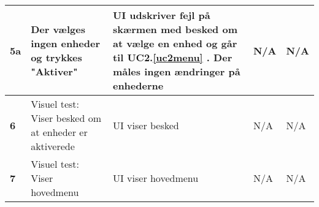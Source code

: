 \begin{center}
\begin{longtable}{|p{}|p{}|p{}|p{}|p{}|}
\textbf{5a}			&Der vælges ingen enheder og trykkes "Aktiver"				
					&UI udskriver fejl på skærmen med besked om at vælge en enhed og går til UC2.\ref{uc2menu}	. 
					 Der måles ingen ændringer på enhederne
					&N/A 
					&N/A \\\hline
		
\textbf{6}			&Visuel test: Viser besked om at enheder er aktiverede
					&UI viser besked
					&N/A
					&N/A \\\hline
					
\textbf{7}			&Visuel test: Viser hovedmenu
					&UI viser hovedmenu
					&N/A
					&N/A \\\hline

															
	\end{longtable}
	\label{ATUC2} 
\end{center}
